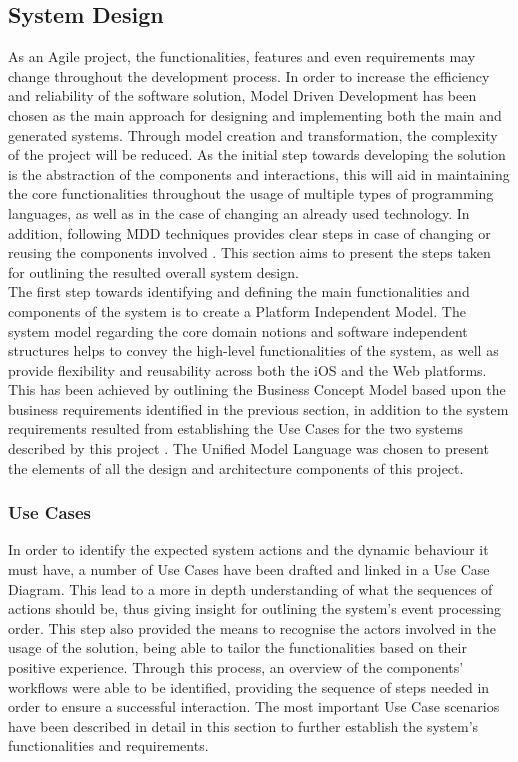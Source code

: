 \subsection{System Design}
As an Agile project, the functionalities, features and even requirements may change throughout the development process. In order to increase the efficiency and reliability of the software solution, Model Driven Development has been chosen as the main approach for designing and implementing both the main and generated systems. Through model creation and transformation, the complexity of the project will be reduced. As the initial step towards developing the solution is the abstraction of the components and interactions, this will aid in maintaining the core functionalities throughout the usage of multiple types of programming languages, as well as in the case of changing an already used technology. In addition, following MDD techniques provides clear steps in case of changing or reusing the components involved \cite{lano_2009}. This section aims to present the steps taken for outlining the resulted overall system design.\\

The first step towards identifying and defining the main functionalities and components of the system is to create a Platform Independent Model. The system model regarding the core domain notions and software independent structures helps to convey the high-level functionalities of the system, as well as provide flexibility and reusability across both the iOS and the Web platforms. This has been achieved by outlining the Business Concept Model based upon the business requirements identified in the previous section, in addition to the system requirements resulted from establishing the Use Cases for the two systems described by this project \cite{sastry_2017}. The Unified Model Language was chosen to present the elements of all the design and architecture components of this project.

\subsubsection{Use Cases}

In order to identify the expected system actions and the dynamic behaviour it must have, a number of Use Cases have been drafted and linked in a Use Case Diagram. This lead to a more in depth understanding of what the sequences of actions should be, thus giving insight for outlining the system's event processing order. This step also provided the means to recognise the actors involved in the usage of the solution, being able to tailor the functionalities based on their positive experience. Through this process, an overview of the components' workflows were able to be identified, providing the sequence of steps needed in order to ensure a successful interaction. The most important Use Case scenarios have been described in detail in this section to further establish the system's functionalities and requirements.\\

